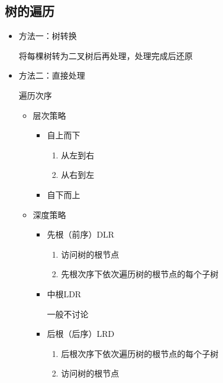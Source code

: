 \documentclass[AutoFakeBold]{LZUThesis2007}
\begin{document}
		\subsection{树的遍历}
		\begin{itemize}
			\item 方法一：树转换

			将每棵树转为二叉树后再处理，处理完成后还原
			\item 方法二：直接处理

						遍历次序
						\begin{itemize}
							\item 层次策略
								\begin{itemize}
									\item 自上而下
										\begin{enumerate}
											\item 从左到右
											\item 从右到左
										\end{enumerate}
									\item 自下而上
								\end{itemize}
							\item 深度策略
								\begin{itemize}
									\item 先根（前序）DLR
										\begin{enumerate}
											\item 访问树的根节点
											\item 先根次序下依次遍历树的根节点的每个子树
										\end{enumerate}
									\item 中根LDR
									
										一般不讨论
									\item 后根（后序）LRD
										\begin{enumerate}
											\item 后根次序下依次遍历树的根节点的每个子树
											\item 访问树的根节点
										\end{enumerate}
								\end{itemize}
						\end{itemize}
		\end{itemize}
\end{document}
